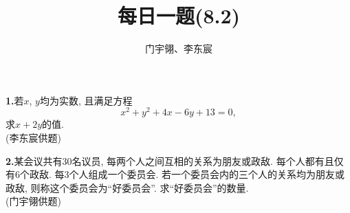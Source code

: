 \documentclass{article}
\title{每日一题(8.2)}
\author{门宇翎、李东宸}
\begin{document}
\maketitle
\textbf{1.}若$x$, $y$均为实数, 且满足方程
\[x^2+y^2+4x-6y+13=0,\]
求$x+2y$的值.\\
{\kaishu (李东宸供题)}\\

\par\textbf{2.}某会议共有30名议员, 每两个人之间互相的关系为朋友或政敌. 每个人都有且仅有6个政敌. 每3个人组成一个委员会. 若一个委员会内的三个人的关系均为朋友或政敌, 则称这个委员会为“好委员会”. 求“好委员会”的数量. \\
{\kaishu (门宇翎供题)}
\end{document}
